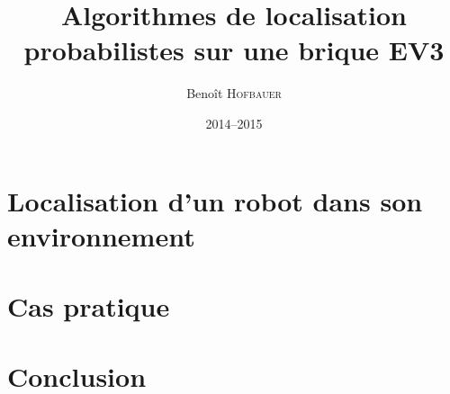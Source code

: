 \documentclass[12pt,a4paper]{./../../template/memoire-umons}
\title{Algorithmes de localisation probabilistes sur une brique EV3}
\author{Beno\^it \textsc{Hofbauer}}
\date{2014--2015}
\begin{document}
\begin{preface}

\tableofcontents
\listoffigures
\end{preface}




%
\part{Localisation d'un robot dans son environnement }





\part{Cas pratique }



\part{Conclusion}





\end{document}
